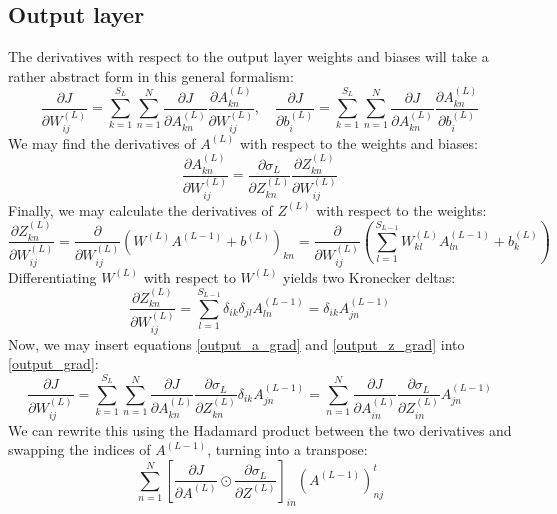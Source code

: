 \documentclass[12pt, a4paper]{article}
\numberwithin{equation}{section}
\begin{document}
\subsection{Output layer}
The derivatives with respect to the output layer weights and biases will take a rather abstract form in this general formalism:
\begin{equation}
\label{output_grad}
\frac{\partial J}{\partial W^{(L)}_{ij}}=\sum_{k=1}^{S_L}\sum_{n=1}^N\frac{\partial J}{\partial A^{(L)}_{kn}}\frac{\partial A^{(L)}_{kn}}{\partial W^{(L)}_{ij}},\quad\frac{\partial J}{\partial b^{(L)}_i}=\sum_{k=1}^{S_L}\sum_{n=1}^N\frac{\partial J}{\partial A^{(L)}_{kn}}\frac{\partial A^{(L)}_{kn}}{\partial b^{(L)}_i}
\end{equation}
We may find the derivatives of $A^{(L)}$ with respect to the weights and biases:
\begin{equation}
\label{output_a_grad}
\frac{\partial A^{(L)}_{kn}}{\partial W^{(L)}_{ij}}=\frac{\partial\sigma_L}{\partial Z^{(L)}_{kn}}\frac{\partial Z^{(L)}_{kn}}{\partial W^{(L)}_{ij}}
\end{equation}
Finally, we may calculate the derivatives of $Z^{(L)}$ with respect to the weights:
\begin{equation}
\frac{\partial Z^{(L)}_{kn}}{\partial W^{(L)}_{ij}}=\frac{\partial}{\partial W^{(L)}_{ij}}(W^{(L)}A^{(L-1)}+b^{(L)})_{kn}=\frac{\partial}{\partial W^{(L)}_{ij}}\left(\sum_{l=1}^{S_{L-1}}W^{(L)}_{kl}A^{(L-1)}_{ln}+b^{(L)}_k\right)
\end{equation}
Differentiating $W^{(L)}$ with respect to $W^{(L)}$ yields two Kronecker deltas:
\begin{equation}
\label{output_z_grad}
\frac{\partial Z^{(L)}_{kn}}{\partial W^{(L)}_{ij}}=\sum_{l=1}^{S_{L-1}}\delta_{ik}\delta_{jl}A^{(L-1)}_{ln}=\delta_{ik} A^{(L-1)}_{jn}
\end{equation}
Now, we may insert equations \ref{output_a_grad} and \ref{output_z_grad} into \ref{output_grad}:
\begin{equation}
\frac{\partial J}{\partial W^{(L)}_{ij}}=\sum_{k=1}^{S_L}\sum_{n=1}^N\frac{\partial J}{\partial A^{(L)}_{kn}}\frac{\partial\sigma_L}{\partial Z^{(L)}_{kn}}\delta_{ik} A^{(L-1)}_{jn}=\sum_{n=1}^N\frac{\partial J}{\partial A^{(L)}_{in}}\frac{\partial\sigma_L}{\partial Z^{(L)}_{in}}A^{(L-1)}_{jn}
\end{equation}
We can rewrite this using the Hadamard product between the two derivatives and swapping the indices of $A^{(L-1)}$, turning into a transpose:
\begin{equation}
\sum_{n=1}^N\left[\frac{\partial J}{\partial A^{(L)}}\odot\frac{\partial\sigma_L}{\partial Z^{(L)}}\right]_{in}\left(A^{(L-1)}\right)^t_{nj}
\end{equation}
\end{document}
